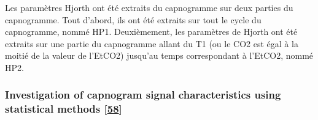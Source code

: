 \documentclass[12pt,]{article}
\begin{document}
Les paramètres Hjorth ont été extraits du capnogramme sur deux parties
du capnogramme. Tout d'abord, ils ont été extraits sur tout le cycle du
capnogramme, nommé HP1. Deuxièmement, les paramètres de Hjorth ont été
extraits sur une partie du capnogramme allant du T1 (ou le CO2 est égal
à la moitié de la valeur de l'EtCO2) jusqu'au temps correspondant à
l'EtCO2, nommé HP2.

\hypertarget{investigation-of-capnogram-signal-characteristics-using-statistical-methods-kazemi2012investigation}{%
\subsubsection{\texorpdfstring{Investigation of capnogram signal
characteristics using statistical methods
{[}\protect\hyperlink{ref-kazemi2012investigation}{58}{]}}{Investigation of capnogram signal characteristics using statistical methods {[}58{]}}}\label{investigation-of-capnogram-signal-characteristics-using-statistical-methods-kazemi2012investigation}}
\end{document}
